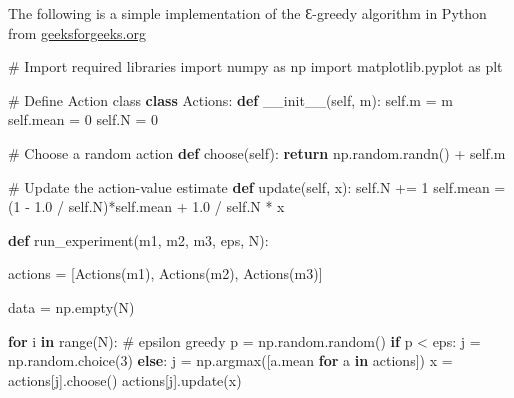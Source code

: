 \documentclass[
  letterpaper,
  DIV=11,
  numbers=noendperiod,
  oneside]{scrartcl}
\newenvironment{Shaded}{\begin{snugshade}}{\end{snugshade}}
\newcommand{\BuiltInTok}[1]{\textcolor[rgb]{0.00,0.23,0.31}{#1}}
\newcommand{\CommentTok}[1]{\textcolor[rgb]{0.37,0.37,0.37}{#1}}
\newcommand{\ControlFlowTok}[1]{\textcolor[rgb]{0.00,0.23,0.31}{\textbf{#1}}}
\newcommand{\DecValTok}[1]{\textcolor[rgb]{0.68,0.00,0.00}{#1}}
\newcommand{\FloatTok}[1]{\textcolor[rgb]{0.68,0.00,0.00}{#1}}
\newcommand{\FunctionTok}[1]{\textcolor[rgb]{0.28,0.35,0.67}{#1}}
\newcommand{\ImportTok}[1]{\textcolor[rgb]{0.00,0.46,0.62}{#1}}
\newcommand{\KeywordTok}[1]{\textcolor[rgb]{0.00,0.23,0.31}{\textbf{#1}}}
\newcommand{\NormalTok}[1]{\textcolor[rgb]{0.00,0.23,0.31}{#1}}
\newcommand{\OperatorTok}[1]{\textcolor[rgb]{0.37,0.37,0.37}{#1}}
\newcommand{\VariableTok}[1]{\textcolor[rgb]{0.07,0.07,0.07}{#1}}
\theoremstyle{definition}
\theoremstyle{remark}
\begin{document}
The following is a simple implementation of the Ɛ-greedy algorithm in
Python from
\href{https://www.geeksforgeeks.org/epsilon-greedy-algorithm-in-reinforcement-learning/?ref=ml_lbp}{geeksforgeeks.org}

\begin{Shaded}
\begin{Highlighting}[]
\CommentTok{\# Import required libraries }
\ImportTok{import}\NormalTok{ numpy }\ImportTok{as}\NormalTok{ np }
\ImportTok{import}\NormalTok{ matplotlib.pyplot }\ImportTok{as}\NormalTok{ plt }
  
\CommentTok{\# Define Action class }
\KeywordTok{class}\NormalTok{ Actions: }
  \KeywordTok{def} \FunctionTok{\_\_init\_\_}\NormalTok{(}\VariableTok{self}\NormalTok{, m): }
    \VariableTok{self}\NormalTok{.m }\OperatorTok{=}\NormalTok{ m }
    \VariableTok{self}\NormalTok{.mean }\OperatorTok{=} \DecValTok{0}
    \VariableTok{self}\NormalTok{.N }\OperatorTok{=} \DecValTok{0}
  
  \CommentTok{\# Choose a random action }
  \KeywordTok{def}\NormalTok{ choose(}\VariableTok{self}\NormalTok{):  }
    \ControlFlowTok{return}\NormalTok{ np.random.randn() }\OperatorTok{+} \VariableTok{self}\NormalTok{.m }
  
  \CommentTok{\# Update the action{-}value estimate }
  \KeywordTok{def}\NormalTok{ update(}\VariableTok{self}\NormalTok{, x): }
    \VariableTok{self}\NormalTok{.N }\OperatorTok{+=} \DecValTok{1}
    \VariableTok{self}\NormalTok{.mean }\OperatorTok{=}\NormalTok{ (}\DecValTok{1} \OperatorTok{{-}} \FloatTok{1.0} \OperatorTok{/} \VariableTok{self}\NormalTok{.N)}\OperatorTok{*}\VariableTok{self}\NormalTok{.mean }\OperatorTok{+} \FloatTok{1.0} \OperatorTok{/} \VariableTok{self}\NormalTok{.N }\OperatorTok{*}\NormalTok{ x }
  
  
\KeywordTok{def}\NormalTok{ run\_experiment(m1, m2, m3, eps, N): }
      
\NormalTok{  actions }\OperatorTok{=}\NormalTok{ [Actions(m1), Actions(m2), Actions(m3)] }
  
\NormalTok{  data }\OperatorTok{=}\NormalTok{ np.empty(N) }
    
  \ControlFlowTok{for}\NormalTok{ i }\KeywordTok{in} \BuiltInTok{range}\NormalTok{(N): }
    \CommentTok{\# epsilon greedy }
\NormalTok{    p }\OperatorTok{=}\NormalTok{ np.random.random() }
    \ControlFlowTok{if}\NormalTok{ p }\OperatorTok{\textless{}}\NormalTok{ eps: }
\NormalTok{      j }\OperatorTok{=}\NormalTok{ np.random.choice(}\DecValTok{3}\NormalTok{) }
    \ControlFlowTok{else}\NormalTok{: }
\NormalTok{      j }\OperatorTok{=}\NormalTok{ np.argmax([a.mean }\ControlFlowTok{for}\NormalTok{ a }\KeywordTok{in}\NormalTok{ actions]) }
\NormalTok{    x }\OperatorTok{=}\NormalTok{ actions[j].choose() }
\NormalTok{    actions[j].update(x) }
  

\end{Highlighting}
\end{Shaded}
\end{document}
